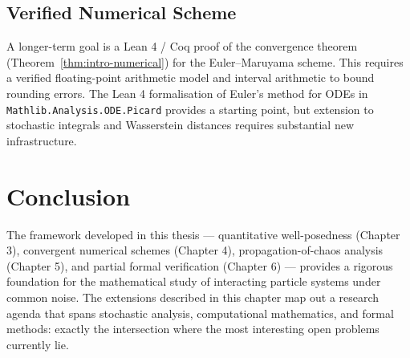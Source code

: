 \subsection{Verified Numerical Scheme}

A longer-term goal is a Lean 4 / Coq proof of the convergence theorem
(Theorem~\ref{thm:intro-numerical}) for the Euler--Maruyama scheme. This requires
a verified floating-point arithmetic model and interval arithmetic to bound
rounding errors. The Lean 4 formalisation of Euler's method for ODEs in
\texttt{Mathlib.Analysis.ODE.Picard} provides a starting point, but
extension to stochastic integrals and Wasserstein distances requires substantial
new infrastructure.

\section{Conclusion}

The framework developed in this thesis --- quantitative well-posedness
(Chapter 3), convergent numerical schemes (Chapter 4), propagation-of-chaos
analysis (Chapter 5), and partial formal verification (Chapter 6) --- provides
a rigorous foundation for the mathematical study of interacting particle systems
under common noise. The extensions described in this chapter map out a research
agenda that spans stochastic analysis, computational mathematics, and formal
methods: exactly the intersection where the most interesting open problems
currently lie.
